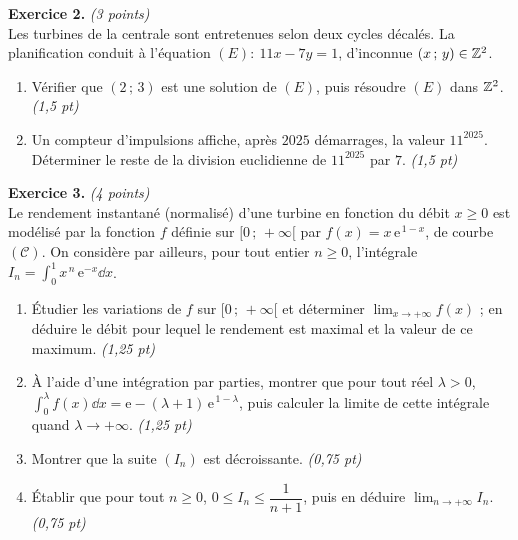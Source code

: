\smallskip
\noindent\textbf{Exercice 2.} \hfill\textit{(3 points)}\\
Les turbines de la centrale sont entretenues selon deux cycles décalés. La planification conduit à
l'équation $(E):\ 11x-7y=1$, d'inconnue $(x\,;\,y)\in\mathbb{Z}^2$.
\begin{enumerate}[label=\arabic*)]
\item Vérifier que $(2\,;\,3)$ est une solution de $(E)$, puis résoudre $(E)$ dans $\mathbb{Z}^2$. \hfill\textit{(1,5 pt)}
\item Un compteur d'impulsions affiche, après $2025$ démarrages, la valeur $11^{2025}$. Déterminer
le reste de la division euclidienne de $11^{2025}$ par $7$. \hfill\textit{(1,5 pt)}
\end{enumerate}

\smallskip
\noindent\textbf{Exercice 3.} \hfill\textit{(4 points)}\\
Le rendement instantané (normalisé) d'une turbine en fonction du débit $x\ge0$ est modélisé par la
fonction $f$ définie sur $[0\,;\,+\infty[$ par $f(x)=x\,\mathrm{e}^{\,1-x}$, de courbe $(\mathcal{C})$.
On considère par ailleurs, pour tout entier $n\ge0$, l'intégrale
$\displaystyle I_n=\int_0^{1}x^{\,n}\,\mathrm{e}^{-x}\dd x$.
\begin{enumerate}[label=\arabic*)]
\item Étudier les variations de $f$ sur $[0\,;\,+\infty[$ et déterminer $\displaystyle\lim_{x\to+\infty}f(x)$ ;
en déduire le débit pour lequel le rendement est maximal et la valeur de ce maximum. \hfill\textit{(1,25 pt)}
\item À l'aide d'une intégration par parties, montrer que pour tout réel $\lambda>0$,
$\displaystyle\int_0^{\lambda}f(x)\dd x=\mathrm{e}-(\lambda+1)\,\mathrm{e}^{\,1-\lambda}$, puis calculer la limite de cette
intégrale quand $\lambda\to+\infty$. \hfill\textit{(1,25 pt)}
\item Montrer que la suite $(I_n)$ est décroissante. \hfill\textit{(0,75 pt)}
\item Établir que pour tout $n\ge0$, $0\le I_n\le\dfrac{1}{n+1}$, puis en déduire $\displaystyle\lim_{n\to+\infty}I_n$. \hfill\textit{(0,75 pt)}
\end{enumerate}

